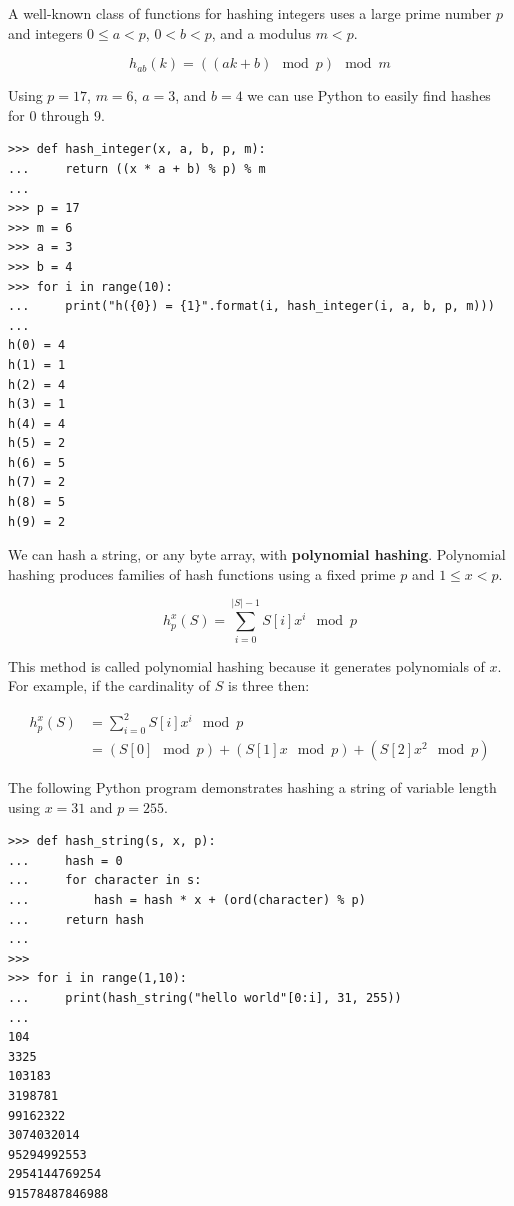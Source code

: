 \documentclass{book}
\begin{document}
A well-known class of functions for hashing integers uses a large prime number $p$ and integers $0 \le a < p$, $0 < b < p$, and a modulus $m < p$.

\begin{equation}
  h_{ab}(k) = ((ak + b) \mod{p}) \mod{m}
\end{equation}

Using $p=17$, $m=6$, $a=3$, and $b=4$ we can use Python to easily find hashes for 0 through 9.

\begin{lstlisting}
>>> def hash_integer(x, a, b, p, m):
...     return ((x * a + b) % p) % m
...
>>> p = 17
>>> m = 6
>>> a = 3
>>> b = 4
>>> for i in range(10):
...     print("h({0}) = {1}".format(i, hash_integer(i, a, b, p, m)))
...
h(0) = 4
h(1) = 1
h(2) = 4
h(3) = 1
h(4) = 4
h(5) = 2
h(6) = 5
h(7) = 2
h(8) = 5
h(9) = 2
\end{lstlisting}

We can hash a string, or any byte array, with \textbf{polynomial hashing}. Polynomial hashing produces families of hash functions using a fixed prime $p$ and $1 \le x < p$.

\begin{equation}
  h_p^x(S) = \sum_{i=0}^{|S|-1} {S[i] x^i \mod{p}}
\end{equation}

This method is called polynomial hashing because it generates polynomials of $x$. For example, if the cardinality of $S$ is three then:

\begin{equation}
  \begin{split}
    h_p^x(S) &= \sum_{i=0}^{2} {S[i] x^i \mod{p}}\\
    &= (S[0] \mod{p}) + (S[1] x \mod{p}) + (S[2] x^2 \mod{p})
  \end{split}
\end{equation}

The following Python program demonstrates hashing a string of variable length using $x=31$ and $p=255$.

\begin{lstlisting}
>>> def hash_string(s, x, p):
...     hash = 0
...     for character in s:
...         hash = hash * x + (ord(character) % p)
...     return hash
...
>>>
>>> for i in range(1,10):
...     print(hash_string("hello world"[0:i], 31, 255))
...
104
3325
103183
3198781
99162322
3074032014
95294992553
2954144769254
91578487846988
\end{lstlisting}
\end{document}
